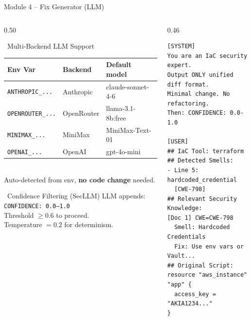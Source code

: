 \documentclass[aspectratio=169, 10pt]{beamer}
\begin{document}
\begin{frame}[fragile]{Module 4 -- Fix Generator (LLM)}
  \begin{columns}[T]
    \begin{column}{0.50\textwidth}
      \begin{block}{\faBrain\ Multi-Backend LLM Support}
        {\scriptsize
        \begin{tabular}{@{}lll@{}}
          \textbf{Env Var} & \textbf{Backend} & \textbf{Default model}\\
          \midrule
          \texttt{ANTHROPIC\_...} & Anthropic & claude-sonnet-4-6\\
          \texttt{OPENROUTER\_...} & OpenRouter & llama-3.1-8b:free\\
          \texttt{MINIMAX\_...} & MiniMax & MiniMax-Text-01\\
          \texttt{OPENAI\_...} & OpenAI & gpt-4o-mini\\
        \end{tabular}
        }\\[0.3em]
        Auto-detected from env, \textbf{no code change} needed.
      \end{block}
      \vspace{0.4em}
      \begin{alertblock}{\faFilter\ Confidence Filtering (SecLLM)}
        LLM appends: \texttt{CONFIDENCE: 0.0--1.0}\\
        Threshold $\geq 0.6$ to proceed.\\
        Temperature $= 0.2$ for determinism.
      \end{alertblock}
    \end{column}
    \begin{column}{0.46\textwidth}
\begin{lstlisting}[caption=Prompt sent to LLM]
[SYSTEM]
You are an IaC security expert.
Output ONLY unified diff format.
Minimal change. No refactoring.
Then: CONFIDENCE: 0.0-1.0

[USER]
## IaC Tool: terraform
## Detected Smells:
- Line 5: hardcoded_credential
  [CWE-798]
## Relevant Security Knowledge:
[Doc 1] CWE=CWE-798
  Smell: Hardcoded Credentials
  Fix: Use env vars or Vault...
## Original Script:
resource "aws_instance" "app" {
  access_key = "AKIA1234..."
}
\end{lstlisting}
    \end{column}
  \end{columns}
\end{frame}
\end{document}
